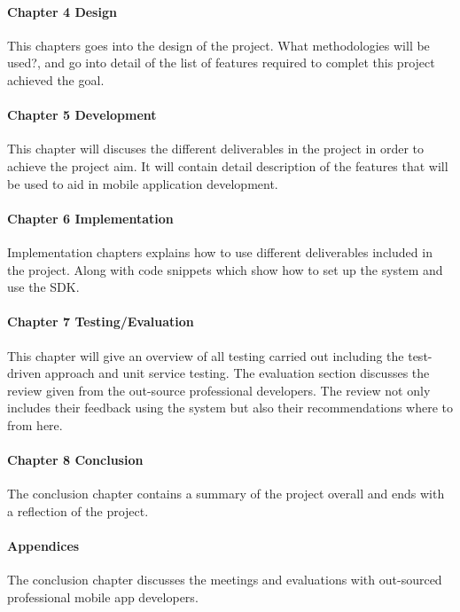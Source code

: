 \paragraph{Chapter 4 Design}

This chapters goes into the design of the project. What methodologies will be used?, and go into detail of the list of features required to complet this project achieved the goal.

\paragraph{Chapter 5 Development}

This chapter will discuses the different deliverables in the project in order to achieve the project aim. It will contain detail description of the features that will be used to aid in mobile application development.

\paragraph{Chapter 6 Implementation}

Implementation chapters explains how to use different deliverables included in the project. Along with code snippets which show how to set up the system and use the SDK.

\paragraph{Chapter 7 Testing/Evaluation}

This chapter will give an overview of all testing carried out including the test-driven approach and unit service testing. The evaluation section discusses the review given from the out-source professional developers. The review not only includes their feedback using the system but also their recommendations where to from here. 

\paragraph{Chapter 8 Conclusion}
The conclusion chapter contains a summary of the project overall and ends with a reflection of the project.

\paragraph{Appendices}
The conclusion chapter discusses the meetings and evaluations with out-sourced professional mobile app developers.